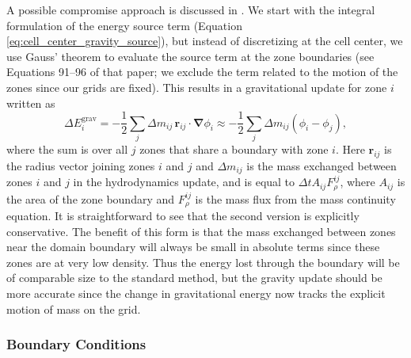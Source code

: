 \documentclass[12pt,preprint]{aastex}
\begin{document}
A possible compromise approach is discussed in \cite{arepo}. We start with the integral formulation of the energy source term (Equation \ref{eq:cell_center_gravity_source}), but instead of discretizing at the cell center, we use Gauss' theorem to evaluate the source term at the zone boundaries (see Equations 91--96 of that paper; we exclude the term related to the motion of the zones since our grids are fixed). This results in a gravitational update for zone $i$ written as
\begin{equation}
  \Delta E^{\text{grav}}_{i} = -\frac{1}{2}\sum_{j} \Delta m_{ij}\, \mathbf{r}_{ij} \cdot \bm{\nabla}\phi_i \approx -\frac{1}{2}\sum_{j} \Delta m_{ij}\left(\phi_i - \phi_j\right),
\end{equation}
where the sum is over all $j$ zones that share a boundary with zone $i$. Here $\mathbf{r}_{ij}$ is the radius vector joining zones $i$ and $j$ and $\Delta m_{ij}$ is the mass exchanged between zones $i$ and $j$ in the hydrodynamics update, and is equal to $\Delta t A_{ij} F_\rho^{ij}$, where $A_{ij}$ is the area of the zone boundary and $F_{\rho}^{ij}$ is the mass flux from the mass continuity equation. It is straightforward to see that the second version is explicitly conservative. The benefit of this form is that the mass exchanged between zones near the domain boundary will always be small in absolute terms since these zones are at very low density. Thus the energy lost through the boundary will be of comparable size to the standard method, but the gravity update should be more accurate since the change in gravitational energy now tracks the explicit motion of mass on the grid.


\subsubsection{Boundary Conditions}\label{sec:gravity_boundary_conditions}
\end{document}
